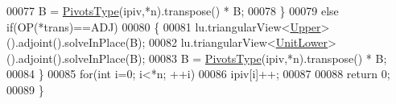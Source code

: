 \begin{DoxyCode}
00077     B = \hyperlink{group___core___module_class_eigen_1_1_map}{PivotsType}(ipiv,*n).transpose() * B;
00078   \}
00079   \textcolor{keywordflow}{else} \textcolor{keywordflow}{if}(OP(*trans)==ADJ)
00080   \{
00081     lu.triangularView<\hyperlink{group__enums_gga39e3366ff5554d731e7dc8bb642f83cda6bcb58be3b8b8ec84859ce0c5ac0aaec}{Upper}>().adjoint().solveInPlace(B);
00082     lu.triangularView<\hyperlink{group__enums_gga39e3366ff5554d731e7dc8bb642f83cda8155cfdfde9e75e7144dff0393d17181}{UnitLower}>().adjoint().solveInPlace(B);
00083     B = \hyperlink{group___core___module_class_eigen_1_1_map}{PivotsType}(ipiv,*n).transpose() * B;
00084   \}
00085   \textcolor{keywordflow}{for}(\textcolor{keywordtype}{int} i=0; i<*n; ++i)
00086     ipiv[i]++;
00087 
00088   \textcolor{keywordflow}{return} 0;
00089 \}
\end{DoxyCode}
